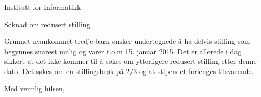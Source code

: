 \documentclass{letter}
\begin{document}
\begin{letter}{Institutt for Informatikk}

\opening{Søknad om redusert stilling}

Grunnet nyankommet tredje barn ønsker undertegnede å ha delvis
stilling som begynnes snarest mulig og varer t.o.m 15. januar
2015. Det er allerede i dag sikkert at det ikke kommer til å søkes om
ytterligere redusert stilling etter denne dato. Det søkes om en
stillingsbrøk på $2/3$ og at stipendet forlenges tilsvarende.


\closing{Med vennlig hilsen,}


\end{letter}
\end{document}
